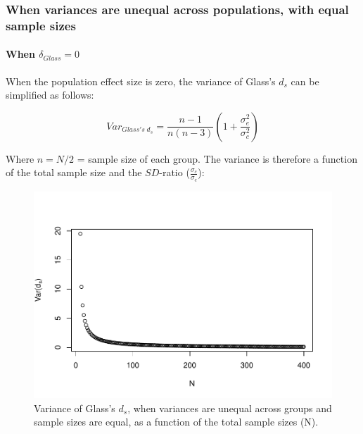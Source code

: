\documentclass[
  man]{apa6}
\begin{document}
\hypertarget{when-variances-are-unequal-across-populations-with-equal-sample-sizes}{%
\subsubsection{When variances are unequal across populations, with equal sample sizes}\label{when-variances-are-unequal-across-populations-with-equal-sample-sizes}}

\hypertarget{when-delta_glass0-1}{%
\paragraph{\texorpdfstring{When \(\delta_{Glass}=0\)}{When \textbackslash delta\_\{Glass\}=0}}\label{when-delta_glass0-1}}

When the population effect size is zero, the variance of Glass's \(d_s\) can be simplified as follows:

\[Var_{Glass's \; d_s} = \frac{n-1}{n(n-3)} \left( 1+\frac{\sigma^2_e}{\sigma^2_c}\right)\]

Where \(n=N/2\) = sample size of each group. The variance is therefore a function of the total sample size and the \(SD\)-ratio (\(\frac{\sigma_c}{\sigma_e}\)):

\begin{figure}
\centering
\includegraphics{Theoretical-Variance-of-all-estimators-as-a-function-of-population-parameters_files/figure-latex/varglassHetbalNsize2-1.pdf}
\caption{\label{fig:varglassHetbalNsize2}Variance of Glass's \(d_s\), when variances are unequal across groups and sample sizes are equal, as a function of the total sample sizes (N).}
\end{figure}
\end{document}
